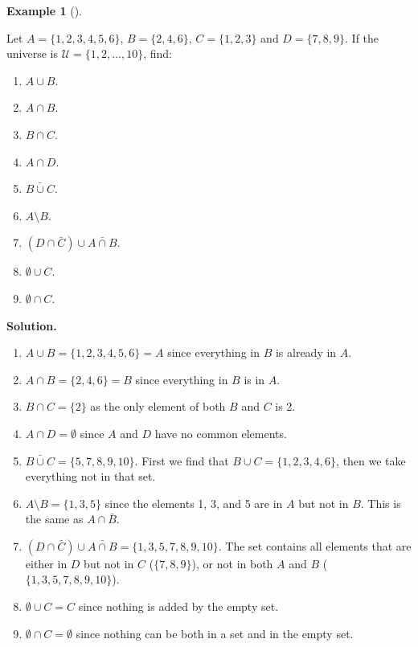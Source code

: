 \documentclass[10pt,]{book}
\theoremstyle{plain}
\theoremstyle{definition}
\newtheorem{example}[theorem]{Example}
\theoremstyle{definition}
\theoremstyle{definition}
\def\U{\mathcal U}
\begin{document}
\begin{example}[]\label{example-5}

          Let \(A = \{1, 2, 3, 4, 5, 6\}\), \(B = \{2, 4, 6\}\), \(C = \{1, 2, 3\}\) and \(D = \{7, 8, 9\}\). If the universe is \(\U = \{1, 2, \ldots, 10\}\), find:
\leavevmode%
\begin{enumerate}
\item\hypertarget{li-48}{}\(A \cup B\).\item\hypertarget{li-49}{}\(A \cap B\).\item\hypertarget{li-50}{}\(B \cap C\).\item\hypertarget{li-51}{}\(A \cap D\).\item\hypertarget{li-52}{}\(\bar{B \cup C}\).\item\hypertarget{li-53}{}\(A \setminus B\).\item\hypertarget{li-54}{}\((D \cap \bar C) \cup \bar{A \cap B}\).\item\hypertarget{li-55}{}\(\emptyset \cup C\).\item\hypertarget{li-56}{}\(\emptyset \cap C\).\end{enumerate}
\par\medskip\noindent%
\textbf{Solution.}\quad \leavevmode%
\begin{enumerate}
\item\hypertarget{li-57}{}\(A \cup B = \{1, 2, 3, 4, 5, 6\} = A\) since everything in \(B\) is already in \(A\).\item\hypertarget{li-58}{}\(A \cap B = \{2, 4, 6\} = B\) since everything in \(B\) is in \(A\).\item\hypertarget{li-59}{}\(B \cap C = \{2\}\) as the only element of both \(B\) and \(C\) is 2.\item\hypertarget{li-60}{}\(A \cap D = \emptyset\) since \(A\) and \(D\) have no common elements.\item\hypertarget{li-61}{}\(\bar{B \cup C} = \{5, 7, 8, 9, 10\}\). First we find that \(B \cup C = \{1, 2, 3, 4, 6\}\), then we take everything not in that set.\item\hypertarget{li-62}{}\(A \setminus B = \{1, 3, 5\}\) since the elements 1, 3, and 5 are in \(A\) but not in \(B\). This is the same as \(A \cap \bar B\).\item\hypertarget{li-63}{}\((D \cap \bar C) \cup \bar{A \cap B} = \{1, 3, 5, 7, 8, 9, 10\}.\) The set contains all elements that are either in \(D\) but not in \(C\) (\(\{7,8,9\}\)), or not in both \(A\) and \(B\) (\(\{1,3,5,7,8,9,10\}\)).\item\hypertarget{li-64}{}\(\emptyset \cup C = C\) since nothing is added by the empty set.\item\hypertarget{li-65}{}\(\emptyset \cap C = \emptyset\) since nothing can be both in a set and in the empty set.\end{enumerate}
\end{example}
\par
\end{document}
